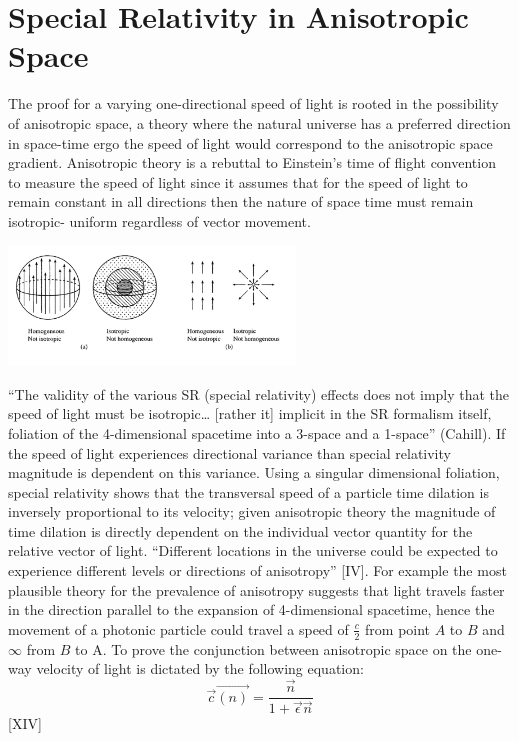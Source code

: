 \documentclass[12pt,letterpaper]{article}
\begin{document}
\section{Special Relativity in Anisotropic Space}
The proof for a varying one-directional speed of light is rooted in the possibility of anisotropic space, a theory where the natural universe has a preferred direction in space-time ergo the speed of light would correspond to the anisotropic space gradient. Anisotropic theory is a rebuttal to Einstein's time of flight convention to measure the speed of light since it assumes that for the speed of light to remain constant in all directions then the nature of space time must remain isotropic- uniform regardless of vector movement.
\begin{center}
    \includegraphics[width=3in]{Screenshot 2022-05-07 at 23.34.11.png}
\end{center}
“The validity of the various SR (special relativity) effects does not imply that the speed of light must be isotropic… [rather it] implicit in the SR formalism itself, foliation of the 4-dimensional spacetime into a 3-space and a 1-space” (Cahill). If the speed of light experiences directional variance than special relativity magnitude is dependent on this variance. Using a singular dimensional foliation, special relativity shows that the transversal speed of a particle time dilation is inversely proportional to its velocity; given anisotropic theory the magnitude of time dilation is directly dependent on the individual vector quantity for the relative vector of light. “Different locations in the universe could be expected to experience different levels or directions of anisotropy” [IV]. For example the most plausible theory for the prevalence of anisotropy suggests  that light travels faster in the direction parallel to the expansion of  4-dimensional spacetime, hence the movement of a photonic particle could travel a speed of  $\frac{c}{2}$  from point $A$ to $B$ and  $\infty$  from $B$ to A. To prove the conjunction between anisotropic space on the one-way velocity of light is dictated by the following equation:
$$\vec {c}\vec{(n)}=\frac{\vec n}{1+\vec \epsilon \vec n}$$ [XIV] 
\end{document}
